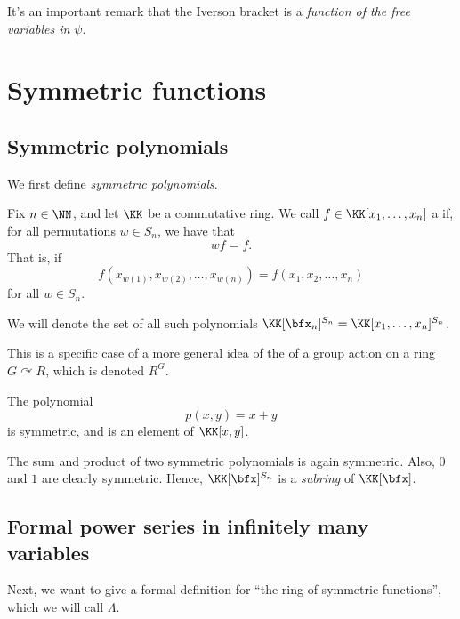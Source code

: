 \documentclass{article}
\newcommand{\pring}[2]{#1 [ {#2} ]}
\begin{document}
It's an important remark that the Iverson bracket is a \textit{function of the free variables in $\psi$}.

\section{Symmetric functions}

\subsection{Symmetric polynomials}

We first define \textit{symmetric polynomials}.

\begin{definition}
    Fix $n \in \NN$, and let $\KK$ be a commutative ring.
    We call $f \in \pring{\KK}{x_1,\ldots,x_n}$ a  if, for all permutations $w \in S_n$, we have that
    \[
        wf = f.
    \]
    That is, if
    \[
        f(x_{w(1)},x_{w(2)},\ldots,x_{w(n)})
        =
        f(x_1,x_2,\ldots,x_n)
    \]
    for all $w \in S_n$.

    We will denote the set of all such polynomials $\pring{\KK}{\bfx_n}^{S_n} = \pring{\KK}{x_1,\ldots,x_n}^{S_n}$.
\end{definition}

This is a specific case of a more general idea of the  of a group action on a ring $G \curvearrowright R$, which is denoted $R^G$.

\begin{example}
    The polynomial
    \[
        p(x,y)
        =
        x + y 
    \]
    is symmetric, and is an element of $\pring{\KK}{x,y}$.
\end{example}

\begin{remark}
    The sum and product of two symmetric polynomials is again symmetric.
    Also, $0$ and $1$ are clearly symmetric.
    Hence, $\pring{\KK}{\bfx}^{S_n}$ is a \textit{subring} of $\pring{\KK}{\bfx}$.
\end{remark}

\subsection{Formal power series in infinitely many variables}

Next, we want to give a formal definition for ``the ring of symmetric functions'', which we will call $\Lambda$.
\end{document}
